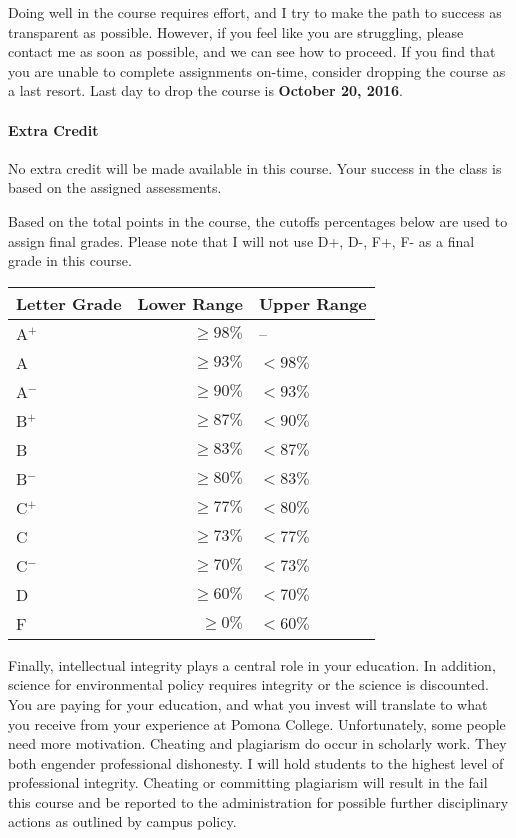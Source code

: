 Doing well in the course requires effort, and I try to make the path to success as transparent as possible. However, if you feel like you are struggling, please contact me as soon as possible, and we can see how to proceed. If you find that you are unable to complete assignments on-time, consider dropping the course as a last resort. Last day to drop the course is \textbf{October 20, 2016}. 

\paragraph{Extra Credit} No extra credit will be made available in this course. Your success in the class is based on the assigned assessments.

Based on the total points in the course, the cutoffs percentages below are used to assign final grades. Please note that I will not use D+, D-, F+, F- as a final grade in this course. 

\begin{table}[htbp]
	\centering
\begin{tabular}{lrl} \hline
Letter Grade & Lower Range & Upper Range \\ \hline\hline
A$^+$  &$ \geq98\%$ & --		 \\
A      & $\geq93\%$ & $<98\%$\\
A$^-$  & $\geq90\%$ & $<93\%$\\
B$^+$  & $\geq87\%$ & $<90\%$\\
B      & $\geq83\%$ & $<87\%$\\
B$^-$  & $\geq80\%$ & $<83\%$\\
C$^+$  & $\geq77\%$ & $<80\%$\\
C      & $\geq73\%$ & $<77\%$\\
C$^-$  & $\geq70\%$ & $<73\%$\\
D      & $\geq60\%$ & $<70\%$\\
F      & $\geq0\% $ & $<60\%$\\ \hline
		\end{tabular}
\end{table}

Finally, intellectual integrity plays a central role in your education. In addition, science for environmental policy requires integrity or the science is discounted. You are paying for your education, and what you invest will translate to what you receive from your experience at Pomona College. Unfortunately, some people need more motivation. Cheating and plagiarism do occur in scholarly work. They both engender professional dishonesty. I will hold students to the highest level of professional integrity. Cheating or committing plagiarism will result in the fail this course and be reported to the administration for possible further disciplinary actions as outlined by campus policy.


